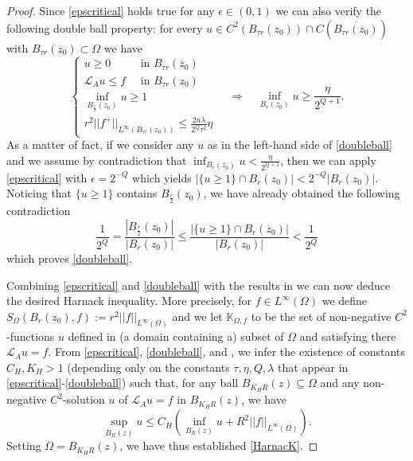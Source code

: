 \documentclass[12pt]{amsart}
\def \L {\mathcal{L}}
\def \t {\tau}
\begin{document}
\begin{proof}
Since \eqref{epscritical} holds true for any $\epsilon\in (0,1)$ we can also verify the following double ball property: for every $u \in C^2(B_{\t r}(z_0)) \cap C(\overline{B_{\t r}(z_0)})$ with $B_{\t r}(z_0)\subset \Omega$ we have
\begin{equation}\label{doubleball}
\begin{cases}
u\geq 0 \quad\quad\,\,\mbox{ in }B_{\t r}(z_0)\\
\L_A u \leq f  \quad\mbox{ in }B_{\t r}(z_0)\\
\inf_{B_\frac{r}{2}(z_0)} u \geq 1\\
r^2||f^+||_{L^{\infty}(B_{\t r}(z_0))} \leq \frac{2n\lambda}{2^{Q}\tau^2} \eta 
\end{cases}
\quad
\Longrightarrow
\quad
\inf_{B_r(z_0)} u \geq \frac{ \eta }{2^{Q+1}}.
\end{equation}
As a matter of fact, if we consider any $u$ as in the left-hand side of \eqref{doubleball} and we assume by contradiction that $\inf_{B_r(z_0)} u < \frac{ \eta }{2^{Q+1}}$, then we can apply \eqref{epscritical} with $\epsilon=2^{-Q}$ which yields $|\{u \geq 1 \} \cap B_{ r}(z_0)| < 2^{-Q} |B_{ r}(z_0)|$. Noticing that $\{u \geq 1 \}$ contains $B_\frac{r}{2}(z_0)$, we have already obtained the following contradiction
$$
\frac{1}{2^Q}=\frac{|B_\frac{r}{2}(z_0)|}{|B_{r}(z_0)|}\leq \frac{|\{u \geq 1 \} \cap B_{ r}(z_0)|}{|B_{ r}(z_0)|}<\frac{1}{2^{Q}}
$$
which proves \eqref{doubleball}.

Combining \eqref{epscritical} 
and \eqref{doubleball} with the results in \cite{DiFGutLan, GM2018} we can now deduce the desired Harnack inequality. More precisely, for $f\in L^\infty(\Omega)$ we define $S_{\Omega}(B_r(z_0), f) := r^2 ||f||_{L^{\infty}(\Omega)}$ and we let $\mathbb{K}_{\Omega,f}$ to be the set of non-negative $C^2$-functions $u$ defined in (a domain containing a) subset of $\Omega$ and satisfying there $\L_A u = f$. From \eqref{epscritical}, \eqref{doubleball}, and \cite[Theorems 2.7 and 2.8]{GM2018}, we infer the existence of constants $C_H, K_H>1$ (depending only on the constants $\tau, \eta, Q, \lambda$ that appear in \eqref{epscritical}-\eqref{doubleball}) such that, for any ball $B_{K_H R}(z)\subseteq \Omega$ and any non-negative $C^2$-solution $u$ of $\L_A u = f$ in $B_{K_H R}(z)$, we have
$$\sup_{B_R(z)} u \leq C_H\left(\inf_{B_R(z)} u + R^2 ||f||_{L^{\infty}(\Omega)} \right).$$
Setting $\Omega=B_{K_H R}(z)$, we have thus established \eqref{HarnacK}.
\end{proof}

\end{document}
